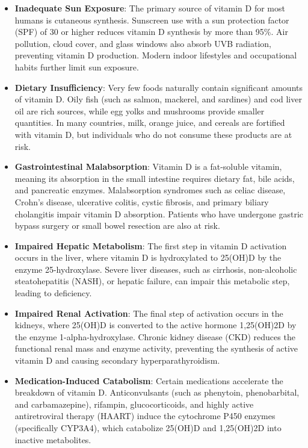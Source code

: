 \begin{itemize}
    \item \textbf{Inadequate Sun Exposure}: The primary source of vitamin D for most humans is cutaneous synthesis. Sunscreen use with a sun protection factor (SPF) of 30 or higher reduces vitamin D synthesis by more than 95\%. Air pollution, cloud cover, and glass windows also absorb UVB radiation, preventing vitamin D production. Modern indoor lifestyles and occupational habits further limit sun exposure.
    \item \textbf{Dietary Insufficiency}: Very few foods naturally contain significant amounts of vitamin D. Oily fish (such as salmon, mackerel, and sardines) and cod liver oil are rich sources, while egg yolks and mushrooms provide smaller quantities. In many countries, milk, orange juice, and cereals are fortified with vitamin D, but individuals who do not consume these products are at risk.
    \item \textbf{Gastrointestinal Malabsorption}: Vitamin D is a fat-soluble vitamin, meaning its absorption in the small intestine requires dietary fat, bile acids, and pancreatic enzymes. Malabsorption syndromes such as celiac disease, Crohn's disease, ulcerative colitis, cystic fibrosis, and primary biliary cholangitis impair vitamin D absorption. Patients who have undergone gastric bypass surgery or small bowel resection are also at risk.
    \item \textbf{Impaired Hepatic Metabolism}: The first step in vitamin D activation occurs in the liver, where vitamin D is hydroxylated to 25(OH)D by the enzyme 25-hydroxylase. Severe liver diseases, such as cirrhosis, non-alcoholic steatohepatitis (NASH), or hepatic failure, can impair this metabolic step, leading to deficiency.
    \item \textbf{Impaired Renal Activation}: The final step of activation occurs in the kidneys, where 25(OH)D is converted to the active hormone 1,25(OH)2D by the enzyme 1-alpha-hydroxylase. Chronic kidney disease (CKD) reduces the functional renal mass and enzyme activity, preventing the synthesis of active vitamin D and causing secondary hyperparathyroidism.
    \item \textbf{Medication-Induced Catabolism}: Certain medications accelerate the breakdown of vitamin D. Anticonvulsants (such as phenytoin, phenobarbital, and carbamazepine), rifampin, glucocorticoids, and highly active antiretroviral therapy (HAART) induce the cytochrome P450 enzymes (specifically CYP3A4), which catabolize 25(OH)D and 1,25(OH)2D into inactive metabolites.
\end{itemize}

